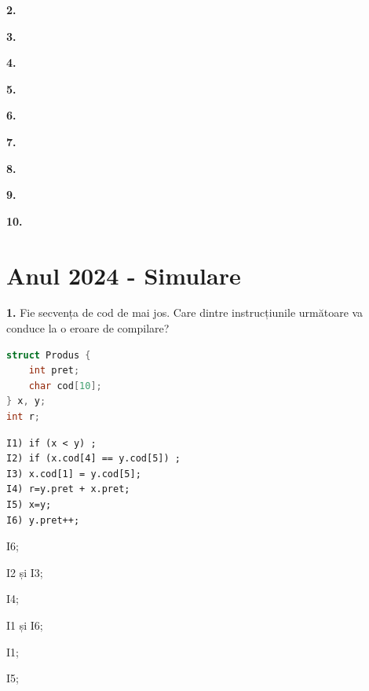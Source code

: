\documentclass[11pt, a4paper]{article}
\begin{document}
\textbf{2.}\newline


\vspace{0.5cm}

\textbf{3.}\newline


\vspace{0.5cm}

\textbf{4.}\newline


\vspace{0.5cm}

\textbf{5.}\newline


\vspace{0.5cm}

\textbf{6.}\newline


\vspace{0.5cm}

\textbf{7.}\newline


\vspace{0.5cm}

\textbf{8.}\newline


\vspace{0.5cm}

\textbf{9.}\newline


\vspace{0.5cm}

\textbf{10.}\newline


\section{Anul 2024 - Simulare}
\textbf{1.}\newline
Fie secvența de cod de mai jos. Care dintre instrucțiunile următoare va conduce la o eroare de compilare?
\begin{lstlisting}[language=C++]
struct Produs {
    int pret;
    char cod[10];
} x, y;
int r;
\end{lstlisting}
\begin{lstlisting}
I1) if (x < y) ;
I2) if (x.cod[4] == y.cod[5]) ;
I3) x.cod[1] = y.cod[5];
I4) r=y.pret + x.pret;
I5) x=y;
I6) y.pret++;
\end{lstlisting}
\begin{inparaenum}
    \item I6;
    \item I2 și I3;
    \item I4;
    \item I1 și I6;
    \item I1;
    \item I5;
\end{inparaenum}
\end{document}
